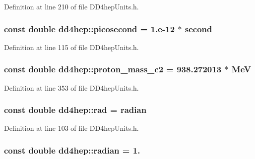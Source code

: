Definition at line 210 of file DD4hepUnits.h.\hypertarget{namespacedd4hep_a0ff865b7e95a5b6116c7a5497895bec3}{
\subsubsection[{picosecond}]{\setlength{\rightskip}{0pt plus 5cm}const double {\bf dd4hep::picosecond} = 1.e-\/12 $\ast$ {\bf second}}}
\label{namespacedd4hep_a0ff865b7e95a5b6116c7a5497895bec3}


Definition at line 115 of file DD4hepUnits.h.\hypertarget{namespacedd4hep_a368ce1f4ff6406804a6e11ba6c86ea3a}{
\subsubsection[{proton\_\-mass\_\-c2}]{\setlength{\rightskip}{0pt plus 5cm}const double {\bf dd4hep::proton\_\-mass\_\-c2} = 938.272013 $\ast$ {\bf MeV}}}
\label{namespacedd4hep_a368ce1f4ff6406804a6e11ba6c86ea3a}


Definition at line 353 of file DD4hepUnits.h.\hypertarget{namespacedd4hep_a9ceaf1c73ffb1a7f13abb23683ac32ba}{
\subsubsection[{rad}]{\setlength{\rightskip}{0pt plus 5cm}const double {\bf dd4hep::rad} = {\bf radian}}}
\label{namespacedd4hep_a9ceaf1c73ffb1a7f13abb23683ac32ba}


Definition at line 103 of file DD4hepUnits.h.\hypertarget{namespacedd4hep_aa67a6662923dd0138a6bf6713eddcebb}{
\subsubsection[{radian}]{\setlength{\rightskip}{0pt plus 5cm}const double {\bf dd4hep::radian} = 1.}}
\label{namespacedd4hep_aa67a6662923dd0138a6bf6713eddcebb}


